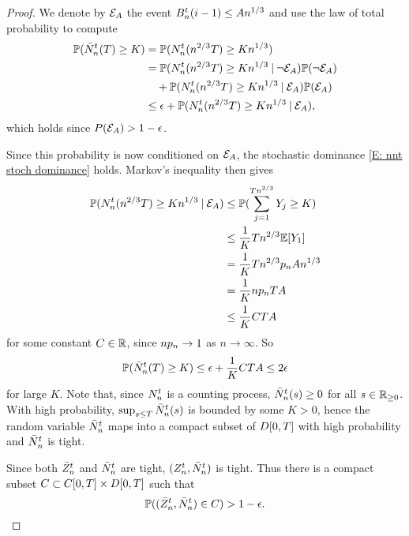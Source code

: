 \begin{proof}
We denote by $\mathcal{E}_{A}$ the event $B_n^t(i-1) \leq An^{1 / 3}$ and use the law of total probability to compute
\begin{align*}
\mathbb{P}(\bar{N}_n^t(T) \geq K) 
&= \mathbb{P}(N_n^t(n^{2 / 3}T) \geq Kn^{1 / 3}) \\
&= \mathbb{P}(N_n^t(n^{2 / 3}T) \geq Kn^{1 / 3} \: | \: \neg\mathcal{E}_{A}) \mathbb{P}(\neg \mathcal{E}_{A}) \\
&\quad + \mathbb{P}(N_n^t(n^{2 / 3}T) \geq Kn^{1 / 3} \: | \: \mathcal{E}_{A}) \mathbb{P}(\mathcal{E}_{A}) \\
&\leq \epsilon + \mathbb{P}(N_n^t(n^{2 / 3}T) \geq Kn^{1 / 3} \: | \: \mathcal{E}_{A}), \\
\end{align*}
which holds since $P(\mathcal{E}_{A}) > 1-\epsilon$.

Since this probability is now conditioned on $\mathcal{E}_{A}$, the stochastic dominance \eqref{E: nnt stoch dominance} holds.
Markov's inequality then gives
\begin{align*}
\mathbb{P}(N_n^t(n^{2 / 3}T) \geq Kn^{1 / 3} \: | \: \mathcal{E}_{A}) 
&\leq \mathbb{P}( \sum_{j=1}^{Tn^{2 / 3}} Y_j \geq K) \\
&\leq \frac{1}{K}Tn^{2 / 3} \mathbb{E}[Y_1] \\
&= \frac{1}{K}Tn^{2 / 3} p_n An^{1 / 3} \\
&= \frac{1}{K}np_n TA \\
&\leq \frac{1}{K}CTA
\end{align*}
for some constant $C \in \mathbb{R}$, since $np_n \rightarrow 1$ as $n \rightarrow \infty$.
So
\begin{equation}
\mathbb{P}(\bar{N}_n^t(T) \geq K) \leq \epsilon + \frac{1}{K}CTA \leq 2 \epsilon
\end{equation}
for large $K$. Note that, since $N_n^t$ is a counting process, $\bar{N}_n^t(s) \geq 0$ for all $s \in \mathbb{R}_{\geq 0}$.
With high probability, $\sup_{s \leq T}\bar{N}_n^t(s)$ is bounded by some $K>0$,
hence the random variable $\bar{N}_n^t$ maps into a compact subset of $D[0, T]$ with high probability and $\bar{N}_n^t$ is tight.

Since both $\bar{Z}^t_n$ and $\bar{N}_n^t$ are tight, $(Z_n^t, \bar{N}_n^t)$ is tight.
Thus there is a compact subset $C \subset C[0, T] \times D[0, T]$ such that
\begin{equation}
	\mathbb{P}( (\bar{Z}^t_n, \bar{N}_n^t) \in C) > 1 - \epsilon.
\end{equation}


\end{proof}
